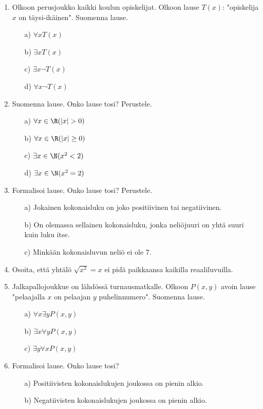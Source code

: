 \begin{enumerate}

\item Olkoon perusjoukko kaikki koulun opiskelijat. Olkoon lause
$T(x)$: "opiskelija $x$ on täysi-ikäinen". Suomenna lause.
\begin{itemize}
\item[a)] $\forall x T(x)$
\item[b)] $\exists x T(x)$
\item[c)] $\exists x \lnot T(x)$
\item[d)] $\forall x \lnot T(x)$
\end{itemize}

\item Suomenna lause. Onko lause tosi? Perustele.
\begin{itemize}
\item[a)] $\forall x\in\R (|x| > 0)$
\item[b)] $\forall x\in\R (|x| \ge 0)$
\item[c)] $\exists x\in\N (x^2 < 2)$
\item[d)] $\exists x\in\N (x^2 = 2)$
\end{itemize}

\item
Formalisoi lause. Onko lause tosi? Perustele.
\begin{itemize}
\item[a)] Jokainen kokonaisluku on joko positiivinen tai
negatiivinen.
\item[b)] On olemassa sellainen kokonaisluku, jonka neliöjuuri on
yhtä suuri kuin luku itse.
\item[c)] Minkään kokonaisluvun neliö ei ole $7$.
\end{itemize}

\item Osoita, että yhtälö $\sqrt{x^2} = x$ ei pidä paikkaansa
kaikilla reaaliluvuilla.

\item Jalkapallojoukkue on lähdössä turnausmatkalle. Olkoon
$P(x,y)$ avoin lause "pelaajalla $x$ on pelaajan $y$
puhelinnumero". Suomenna lause.
\begin{itemize}
\item[a)] $\forall x \exists y P(x,y)$
\item[b)] $\exists x \forall y P(x,y)$
\item[c)] $\exists y \forall x P(x,y)$
\end{itemize}

\item
Formalisoi lause. Onko lause tosi?
\begin{itemize}
\item[a)] Positiivisten kokonaislukujen joukossa on pienin alkio.
\item[b)] Negatiivisten kokonaislukujen joukossa on pienin alkio.
\end{itemize}


\end{enumerate}

